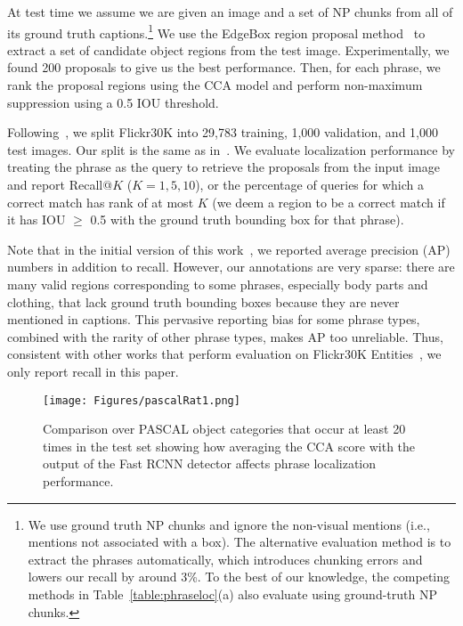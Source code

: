 \documentclass[twocolumn]{svjour3}
\begin{document}
At test time we assume we are given an image and a set of NP chunks from all of its ground truth captions.\footnote{We use ground truth NP chunks and ignore the non-visual mentions (i.e., mentions not associated with a box). The alternative evaluation method is to extract the phrases automatically, which introduces chunking errors and lowers our recall by around 3\%. To the best of our knowledge, the competing methods in Table~\ref{table:phraseloc}(a) also evaluate using ground-truth NP chunks.} We use the EdgeBox region proposal method~\citep{ZitnickECCV14} to extract a set of candidate object regions from the test image. Experimentally, we found 200 proposals to give us the best performance. Then, for each phrase, we rank the proposal regions using the CCA model and perform non-maximum suppression using a 0.5 IOU threshold.

Following~\citet{gong2014improving,karpathy2014deep,klein2014fisher,mao2014deep}, we split Flickr30K into 29,783 training, 1,000 validation, and 1,000 test images. Our split is the same as in~\citet{gong2014improving}. We evaluate localization performance by treating the phrase as the query to retrieve the proposals from the input image and report Recall@$K$ ($K = 1,5,10$), or the percentage of queries for which a correct match has rank of at most $K$ (we deem a region to be a correct match if it has IOU $\ge$ 0.5 with the ground truth bounding box for that phrase). 

Note that in the initial version of this work~\citep{flickrentities}, we reported average precision (AP) numbers in addition to recall. However, our annotations are very sparse: there are many valid regions corresponding to some phrases, especially body parts and clothing, that lack ground truth bounding boxes because they are never mentioned in captions. This pervasive reporting bias for some phrase types, combined with the rarity of other phrase types, makes AP too unreliable. Thus, consistent with other works that perform evaluation on Flickr30K Entities~\citep{fukui16emnlp,hu2016natural,rohrbach2015,wang2016matching}, we only report recall in this paper.







\begin{figure*}
\centering
\texttt{[image: Figures/pascalRat1.png]}
\caption{Comparison over PASCAL object categories that occur at least 20 times in the test set showing how averaging the CCA score with the output of the Fast RCNN detector affects phrase localization performance.
\label{fig:pascalObjects}}
\end{figure*}
\end{document}
